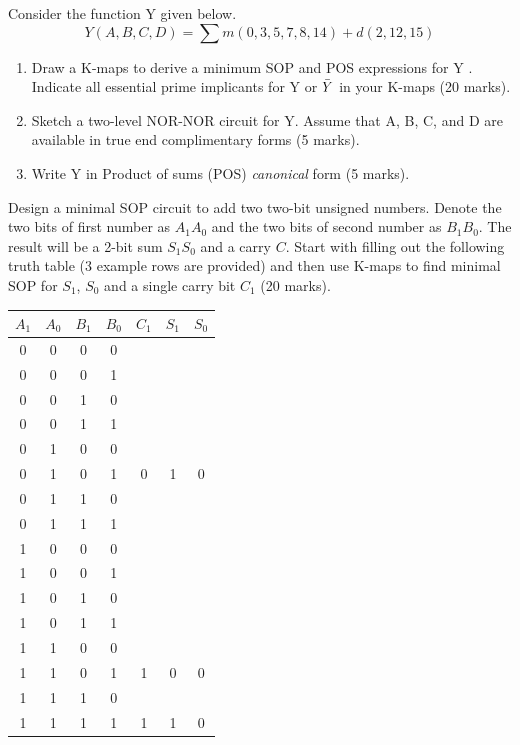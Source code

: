 \begin{prob}
  Consider the function Y given below.
  \[ Y(A, B, C, D) = \sum m(0, 3, 5, 7, 8, 14) + d(2, 12, 15) \]
  \begin{enumerate}
    \item Draw a K-maps to derive a minimum SOP and POS expressions for Y .
      Indicate all essential prime implicants for Y or $\bar{Y}$ in your K-maps (20 marks).
    \item Sketch a two-level NOR-NOR circuit for Y. Assume that A, B, C, and D are available in true end complimentary forms (5 marks).
    \item Write Y in Product of sums (POS) \emph{canonical} form (5 marks).
  \end{enumerate}
\end{prob}

\begin{prob}
  Design a minimal SOP circuit to add two two-bit unsigned numbers. Denote the two bits of first number as $A_1A_0$ and the two bits of second number as $B_1B_0$. The result will be a 2-bit sum $S_1S_0$ and a carry $C$. Start with filling out the following truth table (3 example rows are provided) and then use K-maps to find minimal SOP for $S_1$, $S_0$ and a single carry bit $C_1$ (20 marks).\\
  \begin{tabular}{cccc|ccc}
    \toprule
    $A_1$ & $A_0$ & $B_1$ & $B_0$ & $C_1$ & $S_1$ & $S_0$  \\
    \midrule
    0 & 0 & 0 & 0 &   &   &   \\
    0 & 0 & 0 & 1 &   &   &   \\
    0 & 0 & 1 & 0 &   &   &   \\
    0 & 0 & 1 & 1 &   &   &   \\
    0 & 1 & 0 & 0 &   &   &   \\
    0 & 1 & 0 & 1 & 0 & 1 & 0 \\
    0 & 1 & 1 & 0 &   &   &   \\
    0 & 1 & 1 & 1 &   &   &   \\
    1 & 0 & 0 & 0 &   &   &   \\
    1 & 0 & 0 & 1 &   &   &   \\
    1 & 0 & 1 & 0 &   &   &   \\
    1 & 0 & 1 & 1 &   &   &   \\
    1 & 1 & 0 & 0 &   &   &   \\
    1 & 1 & 0 & 1 & 1 & 0 & 0 \\
    1 & 1 & 1 & 0 &   &   &   \\
    1 & 1 & 1 & 1 & 1 & 1 & 0 \\
    \bottomrule
  \end{tabular}
\end{prob}
